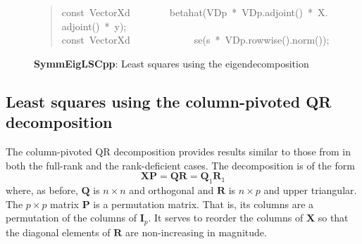 \documentclass[shortnames,article]{jss}
\newcommand{\hlstd}[1]{\textcolor[rgb]{0,0,0}{#1}}
\newcommand{\hlopt}[1]{\textcolor[rgb]{0,0,0}{#1}}
\newcommand{\hlkwb}[1]{\textcolor[rgb]{0.13,0.54,0.13}{#1}}
\newcommand{\hlkwd}[1]{\textcolor[rgb]{0,0,0}{#1}}
\begin{document}
\begin{figure}[htb]
\begin{quote}
    \hlstd{}\hlkwb{const\ }\hlstd{VectorXd}\hlstd{\ \ \ \ \ \ \ \ }\hlstd{}\hlkwd{betahat}\hlstd{}\hlopt{(}\hlstd{VDp\ }\hlopt{{*}\ }\hlstd{VDp}\hlopt{.}\hlstd{}\hlkwd{adjoint}\hlstd{}\hlopt{()\ {*}\ }\hlstd{X}\hlopt{.}\hlstd{}\hlkwd{adjoint}\hlstd{}\hlopt{()\ {*}\ }\hlstd{y}\hlopt{);}\hspace*{\fill}\\
    \hlstd{}\hlkwb{const\ }\hlstd{VectorXd}\hlstd{\ \ \ \ \ \ \ \ \ \ \ \ \ }\hlstd{}\hlkwd{se}\hlstd{}\hlopt{(}\hlstd{s\ }\hlopt{{*}\ }\hlstd{VDp}\hlopt{.}\hlstd{}\hlkwd{rowwise}\hlstd{}\hlopt{().}\hlstd{}\hlkwd{norm}\hlstd{}\hlopt{());}\hlstd{}\hspace*{\fill}
    \normalfont
    \normalsize
  \end{quote}
  \caption{\textbf{SymmEigLSCpp}: Least squares using the eigendecomposition}
  \label{SymmEigLS}
\end{figure}


\subsection{Least squares using the column-pivoted QR decomposition}
\label{sec:colPivQR}

The column-pivoted QR decomposition provides results similar to those
from  in both the full-rank and the rank-deficient cases.
The decomposition is of the form
\begin{displaymath}
  \bm X\bm P=\bm Q\bm R=\bm Q_1\bm R_1
\end{displaymath}
where, as before, $\bm Q$ is $n\times n$ and orthogonal and $\bm R$ is
$n\times p$ and upper triangular.  The $p\times p$ matrix $\bm P$ is a
permutation matrix.  That is, its columns are a permutation of the
columns of $\bm I_p$.  It serves to reorder the columns of $\bm X$ so
that the diagonal elements of $\bm R$ are non-increasing in magnitude.
\end{document}
